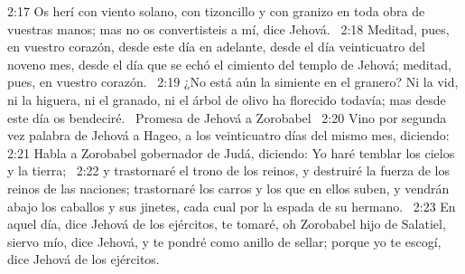 2:17 Os herí con viento solano, con tizoncillo y con granizo en toda obra de vuestras manos; mas no os convertisteis a mí, dice Jehová.  
2:18 Meditad, pues, en vuestro corazón, desde este día en adelante, desde el día veinticuatro del noveno mes, desde el día que se echó el cimiento del templo de Jehová; meditad, pues, en vuestro corazón.  
2:19 ¿No está aún la simiente en el granero? Ni la vid, ni la higuera, ni el granado, ni el árbol de olivo ha florecido todavía; mas desde este día os bendeciré.  
Promesa de Jehová a Zorobabel  
2:20 Vino por segunda vez palabra de Jehová a Hageo, a los veinticuatro días del mismo mes, diciendo:  
2:21 Habla a Zorobabel gobernador de Judá, diciendo: Yo haré temblar los cielos y la tierra;  
2:22 y trastornaré el trono de los reinos, y destruiré la fuerza de los reinos de las naciones; trastornaré los carros y los que en ellos suben, y vendrán abajo los caballos y sus jinetes, cada cual por la espada de su hermano.  
2:23 En aquel día, dice Jehová de los ejércitos, te tomaré, oh Zorobabel hijo de Salatiel, siervo mío, dice Jehová, y te pondré como anillo de sellar; porque yo te escogí, dice Jehová de los ejércitos.